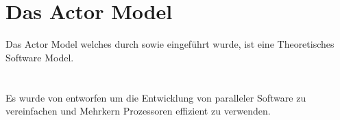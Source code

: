\chapter{Das Actor Model}
Das Actor Model welches durch \cite{hewitt1973session} sowie \cite{Agha1985ActorsSystems} eingeführt wurde, ist eine Theoretisches Software Model. 
\citet{hewitt1973session} \\
\citep{hewitt1973session} \\
\citeauthor{hewitt1973session} \\
\citealt{hewitt1973session}
Es wurde von \cite{hewitt1973session} entworfen um die Entwicklung von paralleler Software zu vereinfachen und Mehrkern Prozessoren effizient zu verwenden.